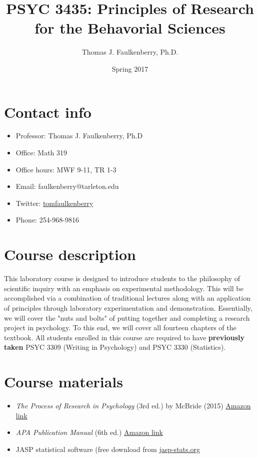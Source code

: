 \documentclass[10pt]{article}
\author{Thomas J. Faulkenberry, Ph.D.}
\date{Spring 2017}
\title{PSYC 3435: Principles of Research for the Behavorial Sciences}
\begin{document}
\maketitle

\section*{Contact info}
\label{sec-1}
\begin{itemize}
\item Professor: Thomas J. Faulkenberry, Ph.D
\item Office: Math 319
\item Office hours: MWF 9-11, TR 1-3
\item Email: faulkenberry@tarleton.edu
\item Twitter: \href{http://twitter.com/tomfaulkenberry}{tomfaulkenberry}
\item Phone: 254-968-9816
\end{itemize}

\section*{Course description}
\label{sec-2}

This laboratory course is designed to introduce students to the philosophy of 
scientific inquiry with an emphasis on experimental methodology. This will be 
accomplished via a combination of traditional lectures along with an application 
of principles through laboratory experimentation and demonstration. Essentially, 
we will cover the "nuts and bolts" of putting together and completing a research 
project in psychology. To this end, we will cover all fourteen chapters of the 
textbook. All students enrolled in this course are required to have 
\textbf{previously taken} PSYC 3309 (Writing in Psychology) and PSYC 3330 (Statistics). 

\section*{Course materials}
\label{sec-3}

\begin{itemize}
\item \emph{The Process of Research in Psychology} (3rd ed.) by McBride (2015) \href{https://www.amazon.com/Process-Research-Psychology-Dawn-McBride/dp/1483347605/}{Amazon link}
\item \emph{APA Publication Manual} (6th ed.) \href{http://www.amazon.com/Publication-Manual-American-Psychological-Association/dp/1433805618/}{Amazon link}
\item JASP statistical software (free download from \href{http://jasp-stats.org}{jasp-stats.org}
\end{itemize}
\end{document}
